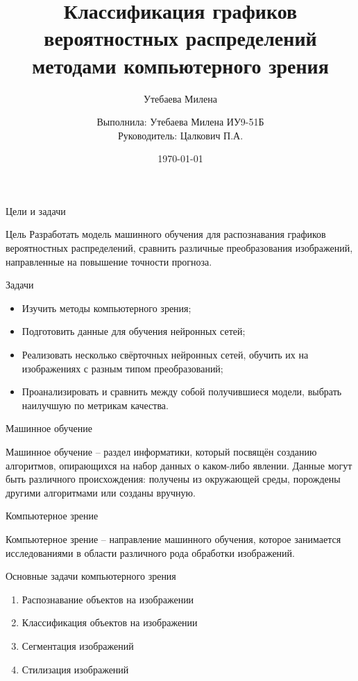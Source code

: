 \documentclass{beamer}
\title{Классификация графиков вероятностных распределений методами компьютерного зрения}
\date{\today}
\author{Утебаева Милена}
\author[me]{Выполнила: Утебаева Милена ИУ9-51Б\\[1mm]Руководитель: Цалкович П.А.}
\begin{document}
\maketitle

\begin{frame}{Цели и задачи}
	\begin{alertblock}{Цель}
		Разработать модель машинного обучения для распознавания графиков вероятностных распределений, сравнить различные преобразования изображений, направленные на повышение точности прогноза.
	\end{alertblock}
	\begin{alertblock}{Задачи}
    
		\begin{itemize}
			\item Изучить методы компьютерного зрения;
			\item Подготовить данные для обучения нейронных сетей;
			\item Реализовать несколько свёрточных нейронных сетей, обучить их на изображениях с разным типом преобразований;
			\item Проанализировать и сравнить между собой получившиеся модели, выбрать наилучшую по метрикам качества.
		\end{itemize}
	\end{alertblock}
\end{frame}



\begin{frame}{Машинное обучение}

	\alert{Машинное обучение} -- раздел информатики, который посвящён созданию алгоритмов, опирающихся на набор данных о каком-либо явлении. Данные могут быть различного происхождения: получены из окружающей среды, порождены другими алгоритмами или созданы вручную.



\end{frame}

\begin{frame}{Компьютерное зрение}

	\alert{Компьютерное зрение} -- направление машинного обучения, которое занимается исследованиями в области различного рода обработки изображений.

	\begin{alertblock}{Основные задачи компьютерного зрения}
		\begin{enumerate}
			\item Распознавание объектов на изображении
                \item Классификация объектов на изображении
			\item Сегментация изображений
			\item Стилизация изображений
		\end{enumerate}
	\end{alertblock}



\end{frame}
\end{document}
